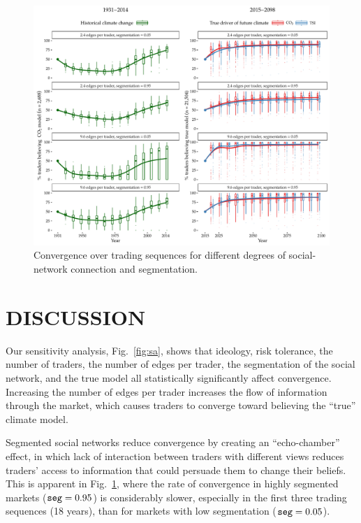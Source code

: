 \documentclass{wscpaperproc}\usepackage[]{graphicx}\usepackage[]{color}
\makeatletter
\def\maxwidth{ %
  \ifdim\Gin@nat@width>\linewidth
    \linewidth
  \else
    \Gin@nat@width
  \fi
}
\newenvironment{knitrout}{}{} %
\makeatother
\begin{document}
\begin{knitrout}
\color{fgcolor}\begin{figure}[t]

{\centering \includegraphics[width=\maxwidth]{figure/time-1} 

}

\caption[Convergence over trading sequences for different degrees of social-network connection and segmentation]{Convergence over trading sequences for different degrees of social-network connection and segmentation.}\label{fig:time}
\end{figure}


\end{knitrout}

\section{DISCUSSION}

Our sensitivity analysis, Fig.~\ref{fig:sa}, shows that ideology, risk tolerance, the number of traders, the number of edges per trader, the segmentation of the social network, and the true model all statistically significantly affect convergence.  Increasing the number of edges per trader increases the flow of information through the market, which causes traders to converge toward believing the ``true'' climate model.

Segmented social networks reduce convergence by creating an ``echo-chamber'' effect, in which lack of interaction between traders with different views reduces traders' access to information that could persuade them to change their beliefs. This is apparent in Fig.~\ref{fig:time}, where the rate of convergence in highly segmented markets ($\text{\texttt{seg}} = 0.95$) is considerably slower, especially in the first three trading sequences (18 years), than for markets with low segmentation ($\text{\texttt{seg}} = 0.05$).
\end{document}
